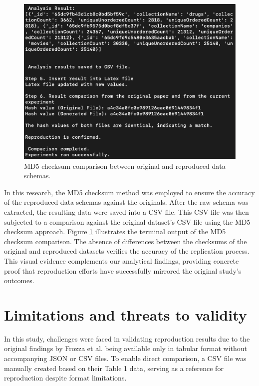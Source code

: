 \documentclass[sigconf, nonacm]{acmart}
\begin{document}
\begin{figure}[H]
    \centering
    \includegraphics[width=\linewidth]{figures/analysis_result.png} 
    \caption{MD5 checksum comparison between original and reproduced data schemas.}
    \label{fig:md5_comparison}
\end{figure}

In this research, the MD5 checksum method was employed to ensure the accuracy of the reproduced data schemas against the originals. After the raw schema was extracted, the resulting data were saved into a CSV file. This CSV file was then subjected to a comparison against the original dataset's CSV file using the MD5 checksum approach. Figure \ref{fig:md5_comparison} illustrates the terminal output of the MD5 checksum comparison. The absence of differences between the checksums of the original and reproduced datasets verifies the accuracy of the replication process. This visual evidence complements our analytical findings, providing concrete proof that reproduction efforts have successfully mirrored the original study's outcomes.

\section{Limitations and threats to validity}

In this study, challenges were faced in validating reproduction results due to the original findings by Frozza et al. being available only in tabular format without accompanying JSON or CSV files. To enable direct comparison, a CSV file was manually created based on their Table 1 data, serving as a reference for reproduction despite format limitations.



\end{document}
